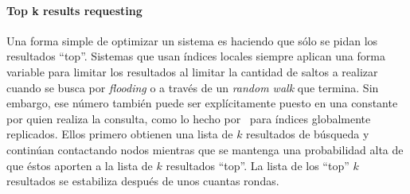 \paragraph{Top k results requesting~\cite{cuenca2003planetp}} %
Una forma simple de optimizar un sistema es haciendo que sólo se pidan los
resultados ``top''. Sistemas que usan índices locales siempre aplican una forma
variable para limitar los resultados al limitar la cantidad de saltos a realizar
cuando se busca por \textit{flooding} o a través de un \textit{random walk} que
termina. Sin embargo, ese número también puede ser explícitamente puesto en una
constante por quien realiza la consulta, como lo hecho por~\citealt{cuenca2003planetp} %
para índices globalmente replicados. Ellos primero obtienen una lista de $k$
resultados de búsqueda y continúan contactando nodos mientras que se mantenga una
probabilidad alta de que éstos aporten a la lista de $k$ resultados ``top''. La lista de
los ``top'' $k$ resultados se estabiliza después de unos cuantas rondas.

